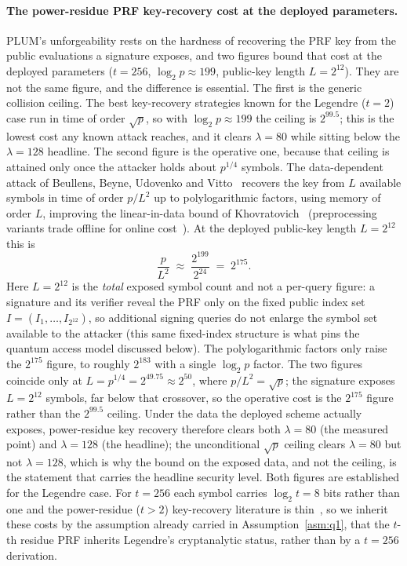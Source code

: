 \paragraph{The power-residue PRF key-recovery cost at the deployed parameters.}
PLUM's unforgeability rests on the hardness of recovering the PRF key from the public evaluations a signature exposes, and two figures bound that cost at the deployed parameters ($t=256$, $\log_2 p\approx199$, public-key length $L=2^{12}$). They are not the same figure, and the difference is essential. The first is the generic collision ceiling. The best key-recovery strategies known for the Legendre ($t{=}2$) case run in time of order $\sqrt p$, so with $\log_2 p\approx199$ the ceiling is $2^{99.5}$; this is the lowest cost any known attack reaches, and it clears $\lambda=80$ while sitting below the $\lambda=128$ headline. The second figure is the operative one, because that ceiling is attained only once the attacker holds about $p^{1/4}$ symbols. The data-dependent attack of Beullens, Beyne, Udovenko and Vitto~\cite{beullensbeyne2020} recovers the key from $L$ available symbols in time of order $p/L^2$ up to polylogarithmic factors, using memory of order $L$, improving the linear-in-data bound of Khovratovich~\cite{khovratovich2019legendre} (preprocessing variants trade offline for online cost~\cite{may2022legendre}). At the deployed public-key length $L=2^{12}$ this is
\begin{equation*}
  \frac{p}{L^2}\;\approx\;\frac{2^{199}}{2^{24}}\;=\;2^{175}.
\end{equation*}
Here $L=2^{12}$ is the \emph{total} exposed symbol count and not a per-query figure: a signature and its verifier reveal the PRF only on the fixed public index set $I=(I_1,\dots,I_{2^{12}})$, so additional signing queries do not enlarge the symbol set available to the attacker (this same fixed-index structure is what pins the quantum access model discussed below). The polylogarithmic factors only raise the $2^{175}$ figure, to roughly $2^{183}$ with a single $\log_2 p$ factor. The two figures coincide only at $L=p^{1/4}=2^{49.75} \approx2^{50}$, where $p/L^2=\sqrt p$; the signature exposes $L=2^{12}$ symbols, far below that crossover, so the operative cost is the $2^{175}$ figure rather than the $2^{99.5}$ ceiling. Under the data the deployed scheme actually exposes, power-residue key recovery therefore clears both $\lambda=80$ (the measured point) and $\lambda=128$ (the headline); the unconditional $\sqrt p$ ceiling clears $\lambda=80$ but not $\lambda=128$, which is why the bound on the exposed data, and not the ceiling, is the statement that carries the headline security level. Both figures are established for the Legendre case. For $t=256$ each symbol carries $\log_2 t=8$ bits rather than one and the power-residue ($t>2$) key-recovery literature is thin~\cite{beullensbeyne2020}, so we inherit these costs by the assumption already carried in Assumption~\ref{asm:q1}, that the $t$-th residue PRF inherits Legendre's cryptanalytic status, rather than by a $t=256$ derivation.

